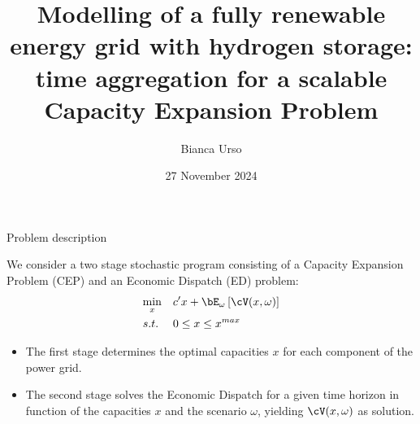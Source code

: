 \documentclass[pdf]{beamer}
\title[Time aggregation for a scalable CEP]{Modelling of a fully renewable energy grid with hydrogen storage: time aggregation for a scalable Capacity Expansion Problem}
\author[Bianca Urso]{Bianca Urso}
\institute{Istituto Universitario di Studi Superiori}
\date{27 November 2024}
\newcommand{\cG}{\mathcal{G}}
\begin{document}
{
\begin{frame}
  \titlepage
\end{frame}
}
\addtocounter{framenumber}{-1}


\begin{frame}
\end{frame}

\begin{frame}{Problem description}
  
  We consider a two stage stochastic program consisting of a Capacity Expansion Problem (CEP) and an Economic Dispatch (ED) problem:
    \begin{align*}
      \min_{x} \quad & c'x + \bE_{\omega}\left[\cV(x,\omega)\right] \\ 
      s.t. \;   \quad  & 0 \leq x \leq x^{max}
    \end{align*}
    \begin{itemize}
      \item The first stage determines the optimal capacities \(x\) for each component of the power grid. %
      \item The second stage solves the Economic Dispatch for a given time horizon in function of the capacities \(x\) and the scenario \(\omega\), yielding \(\cV(x,\omega)\) as solution.
    \end{itemize}



\end{frame}
\end{document}
